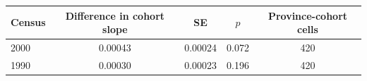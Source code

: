 \begin{tabular}{@{}lcccc@{}}
\toprule
Census & Difference in cohort slope & SE & $p$ & Province-cohort cells \\
\midrule
2000 & 0.00043 & 0.00024 & 0.072 & 420 \\
1990 & 0.00030 & 0.00023 & 0.196 & 420 \\
\bottomrule
\end{tabular}
